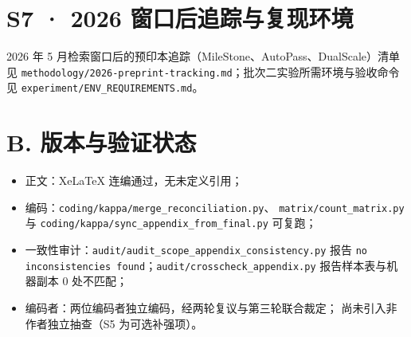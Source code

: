 \documentclass[11pt,a4paper]{article}
\begin{document}
\section{S7 · 2026 窗口后追踪与复现环境}
2026 年 5 月检索窗口后的预印本追踪（MileStone、AutoPass、DualScale）清单见
\texttt{methodology/2026-preprint-tracking.md}；批次二实验所需环境与验收命令见
\texttt{experiment/ENV\_REQUIREMENTS.md}。

\section*{B. 版本与验证状态}
\begin{itemize}[leftmargin=2em,itemsep=1pt]
  \item 正文：XeLaTeX 连编通过，无未定义引用；
  \item 编码：\texttt{coding/kappa/merge\_reconciliation.py}、
    \texttt{matrix/count\_matrix.py} 与
    \texttt{coding/kappa/sync\_appendix\_from\_final.py} 可复跑；
  \item 一致性审计：\texttt{audit/audit\_scope\_appendix\_consistency.py} 报告
    \texttt{no inconsistencies found}；\texttt{audit/crosscheck\_appendix.py}
    报告样本表与机器副本 0 处不匹配；
  \item 编码者：两位编码者独立编码，经两轮复议与第三轮联合裁定；
    尚未引入非作者独立抽查（S5 为可选补强项）。
\end{itemize}
\end{document}
